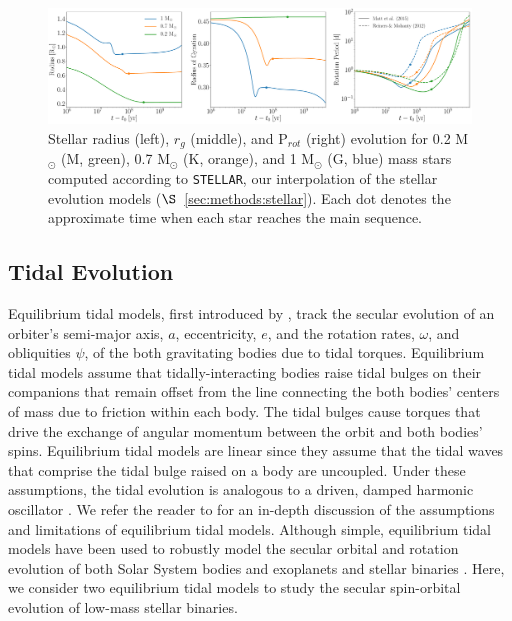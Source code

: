 \documentclass[twocolumn]{aastex61}
\newcommand{\stellar}[0]{\texttt{STELLAR}\xspace}
\begin{document}
\begin{figure}[ht]
	\includegraphics[width=\textwidth]{../Plots/stellarExample.pdf}
   \caption{Stellar radius (left), $r_g$ (middle), and P$_{rot}$ (right) evolution for 0.2 M$_{\odot}$ (M, green), 0.7 M$_{\odot}$ (K, orange), and 1 M$_{\odot}$ (G, blue) mass stars computed according to \stellar, our interpolation of the \citet{Baraffe2015} stellar evolution models ($\S$~\ref{sec:methods:stellar}). Each dot denotes the approximate time when each star reaches the main sequence.}%
    \label{fig:stellarExample}%
\end{figure}

\subsection{Tidal Evolution} \label{sec:methods:eqtide}

 Equilibrium tidal models, first introduced by \citep{Darwin1880}, track the secular evolution of an orbiter's semi-major axis, $a$, eccentricity, $e$, and the rotation rates, $\omega$, and obliquities $\psi$, of the both gravitating bodies due to tidal torques. Equilibrium tidal models assume that tidally-interacting bodies raise tidal bulges on their companions that remain offset from the line connecting the both bodies' centers of mass due to friction within each body.  The tidal bulges cause torques that drive the exchange of angular momentum between the orbit and both bodies' spins. Equilibrium tidal models are linear since they assume that the tidal waves that comprise the tidal bulge raised on a body are uncoupled. Under these assumptions, the tidal evolution is analogous to a driven, damped harmonic oscillator \citep{Greenberg2009}.  We refer the reader to \citet{Barnes2017} for an in-depth discussion of the assumptions and limitations of equilibrium tidal models.  Although simple, equilibrium tidal models have been used to robustly model the secular orbital and rotation evolution of both Solar System bodies and exoplanets \citet[e.g.][]{Goldreich1966,Jackson2009,Leconte2010,Heller2011,Barnes2013,Barnes2017} and stellar binaries \citep[e.g.][]{Zahn1989,Zahn2008,Khaliullin2011,Repetto2014,Fleming2018}.  Here, we consider two equilibrium tidal models to study the secular spin-orbital evolution of low-mass stellar binaries.  
\end{document}
